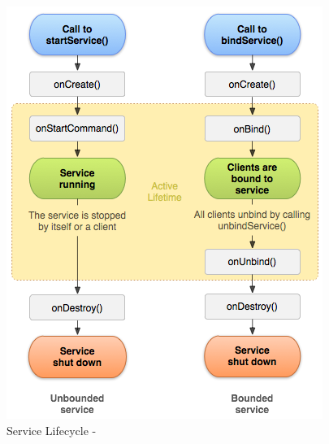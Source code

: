\documentclass[Bachelorarbeit.tex]{subfiles}
\begin{document}
\begin{figure}
\centering
\includegraphics[width=0.7\linewidth]{./img/service_lifecycle}
\caption[Service Lifecycle]{Service Lifecycle - \parencite[Quelle:][]{android_service}}
\label{fig:service_lifecycle}
\end{figure}
\end{document}
